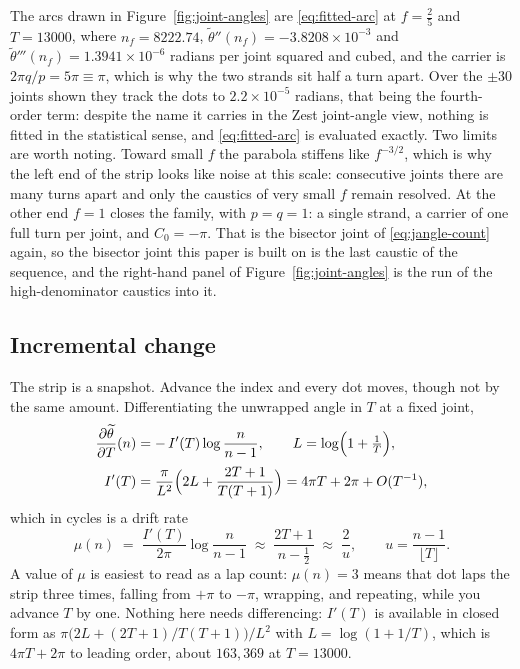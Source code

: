 \documentclass[11pt]{article}
\theoremstyle{definition}
\begin{document}
The arcs drawn in Figure~\ref{fig:joint-angles} are \eqref{eq:fitted-arc} at
$f=\tfrac25$ and $T=13000$, where $n_f=8222.74$,
$\widetilde\theta''(n_f)=-3.8208\times10^{-3}$ and
$\widetilde\theta'''(n_f)=1.3941\times10^{-6}$ radians per joint squared and
cubed, and the carrier is $2\pi q/p=5\pi\equiv\pi$, which is why the two strands
sit half a turn apart. Over the $\pm30$ joints shown they track the dots to
$2.2\times10^{-5}$ radians, that being the fourth-order term: despite the name it
carries in the Zest joint-angle view, nothing is fitted in the statistical sense,
and \eqref{eq:fitted-arc} is evaluated exactly. Two limits are worth noting.
Toward small $f$ the parabola stiffens like $f^{-3/2}$, which is why the
left end of the strip looks like noise at this scale: consecutive joints there
are many turns apart and only the caustics of very small $f$ remain resolved. At
the other end $f=1$ closes the family, with $p=q=1$: a single strand, a carrier of
one full turn per joint, and $C_0=-\pi$. That is the bisector joint of
\eqref{eq:jangle-count} again, so the bisector joint this paper is built on is the last
caustic of the sequence, and the right-hand panel of
Figure~\ref{fig:joint-angles} is the run of the high-denominator caustics into
it.

\subsection{Incremental change}\label{sec:incremental}

The strip is a snapshot. Advance the index and every dot moves, though not by
the same amount. Differentiating the unwrapped angle in $T$ at a fixed joint,
\begin{equation}\label{eq:jangle-drift}
\begin{aligned}
\frac{\partial\widetilde\theta}{\partial T}(n)&=-\,I'(T)\log\frac{n}{n-1},
\qquad L=\log\Bigl(1+\tfrac1T\Bigr),\\[2pt]
I'(T)&=\frac{\pi}{L^{2}}\Bigl(2L+\frac{2T+1}{T(T+1)}\Bigr)
=4\pi T+2\pi+O(T^{-1}),
\end{aligned}
\end{equation}
which in cycles is a drift rate
\begin{equation}\label{eq:jangle-drift-cycles}
\mu(n)\;=\;\frac{I'(T)}{2\pi}\log\frac{n}{n-1}
\;\approx\;\frac{2T+1}{n-\tfrac12}\;\approx\;\frac{2}{u},
\qquad u=\frac{n-1}{\lfloor T\rfloor}.
\end{equation}
A value of $\mu$ is easiest to read as a lap count: $\mu(n)=3$ means that dot
laps the strip three times, falling from $+\pi$ to $-\pi$, wrapping, and
repeating, while you advance $T$ by one. Nothing here needs differencing:
$I'(T)$ is available in closed form as
$\pi\bigl(2L+(2T+1)/T(T+1)\bigr)/L^{2}$ with $L=\log(1+1/T)$, which is
$4\pi T+2\pi$ to leading order, about $163{,}369$ at $T=13000$.
\end{document}
